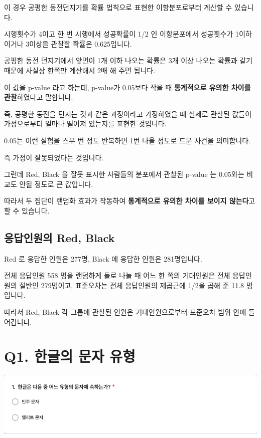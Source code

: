 \documentclass[
]{book}
\begin{document}
이 경우 공평한 동전던지기를 확률 법칙으로 표현한 이항분포로부터 계산할 수 있습니다.

시행횟수가 4이고 한 번 시행에서 성공확률이 1/2 인 이항분포에서 성공횟수가 1이하이거나 3이상을 관찰할 확률은 0.625입니다.

공평한 동전 던지기에서 앞면이 1개 이하 나오는 확률은 3개 이상 나오는 확률과 같기 때문에 사실상 한쪽만 계산해서 2배 해 주면 됩니다.

이 값을 p-value 라고 하는데, p-value가 0.05보다 작을 때 \textbf{통계적으로 유의한 차이를 관찰}하였다고 말합니다.

즉, 공평한 동전을 던지는 것과 같은 과정이라고 가정하였을 때 실제로 관찰된 값들이 가정으로부터 얼마나 떨어져 있는지를 표현한 것입니다.

0.05는 이런 실험을 스무 번 정도 반복하면 1번 나올 정도로 드문 사건을 의미합니다.

즉 가정이 잘못되었다는 것입니다.

그런데 Red, Black 을 잘못 표시한 사람들의 분포에서 관찰된 p-value 는 0.05와는 비교도 안될 정도로 큰 값입니다.

따라서 두 집단이 랜덤화 효과가 작동하여 \textbf{통계적으로 유의한 차이를 보이지 않는다}고 할 수 있습니다.

\subsection{응답인원의 Red, Black}\label{uxc751uxb2f5uxc778uxc6d0uxc758-red-black-4}

Red 로 응답한 인원은 277명, Black 에 응답한 인원은 281명입니다.

전체 응답인원 558 명을 랜덤하게 둘로 나눌 때 어느 한 쪽의 기대인원은 전체 응답인원의 절반인 279명이고, 표준오차는 전체 응답인원의 제곱근에 1/2을 곱해 준 11.8 명입니다.

따라서 Red, Black 각 그룹에 관찰된 인원은 기대인원으로부터 표준오차 범위 안에 들어갑니다.

\section{Q1. 한글의 문자 유형}\label{q1.-uxd55cuxae00uxc758-uxbb38uxc790-uxc720uxd615}

\begin{flushleft}\includegraphics[width=0.75\linewidth]{./pics/Quiz210323_Q1} \end{flushleft}
\end{document}
